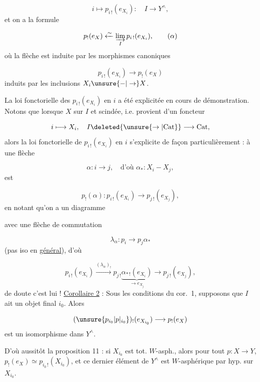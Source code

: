 \[
i\longmapsto p_{i\,!}(e_{X_i}):\quad I\longrightarrow Y^\wedge,
\]
et on a la formule

\[
p_!(e_X)\xleftarrow{\sim}\underset{I}{\varinjlim}\,p_{i\,!}(e_{X_i}),\tag*{($\alpha$)}
\]
où la flèche est induite par les morphismes canoniques

\[
p_{i\,!}(e_{X_i})\to p_!(e_X)
\]
induits par les inclusions $X_i\unsure{-|\to}X$.

La loi fonctorielle des $p_{i\,!}(e_{X_i})$ en $i$ a été explicitée en cours de démonstration. Notons que lorsque $X$ sur $I$  et scindée, i.e. provient d'un foncteur

\[
i\longmapsto X_i,\quad I\deleted{\unsure{\to|\mathrm{Cat}}}\longrightarrow\mathrm{Cat},
\]
alors la loi fonctorielle de $p_{i\,!}(e_{X_i})$ en $i$ s'explicite de façon particulièrement  : à une flèche

\[
\alpha:i\to j,\quad\text{d'où }\alpha_*:X_i-X_j,
\]
est 

\[
p_!(\alpha):p_{i\,!}(e_{X_i})\longrightarrow p_{j\,!}(e_{X_j}),
\]
en notant qu'on a un diagramme

avec une flèche de commutation

\[
\lambda_\alpha:p_i\longrightarrow p_j\alpha_*
\]
(pas iso en \uline{général}), d'où

\[
p_{i\,!}(e_{X_i})\xrightarrow{(\lambda_\alpha)_!}
p_{j\,!}\underbrace{\alpha_{*\,!}(e_{X_i})}_{\longrightarrow e_{X_j}}
\longrightarrow p_{j\,!}(e_{X_j}),
\]
 de doute c'est lui ! 
\uline{Corollaire 2} : Sous les conditions du cor.~1, supposons que $I$ ait un objet final $i_0$. Alors

\[
(\unsure{p_{i_0}|p\vert_{i_0}})_!(e_{X_{i_0}})\longrightarrow p_!(e_X)
\]
est un isomorphisme dans $Y^\wedge$.

D'où aussitôt la proposition 11 : si $X_{i_0}$ est  tot. $W$-asph., alors  pour tout $p:X\to Y$, $p_!(e_X)\simeq p_{i_0\,!}(X_{i_0})$, et ce dernier élément de $Y^\wedge$ est $W$-asphérique par hyp. sur $X_{i_0}$.

